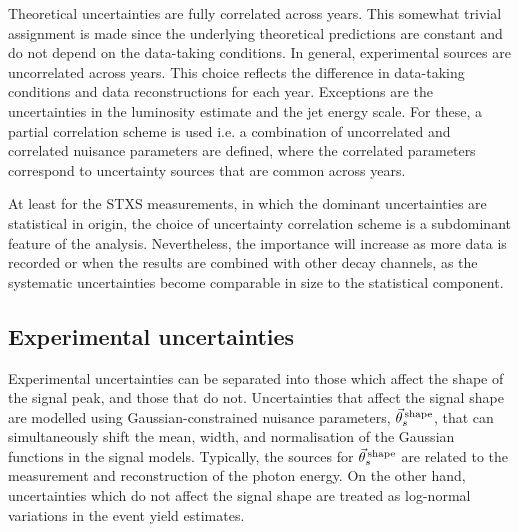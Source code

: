 Theoretical uncertainties are fully correlated across years. This somewhat trivial assignment is made since the underlying theoretical predictions are constant and do not depend on the data-taking conditions. In general, experimental sources are uncorrelated across years. This choice reflects the difference in data-taking conditions and data reconstructions for each year. Exceptions are the uncertainties in the luminosity estimate and the jet energy scale. For these, a partial correlation scheme is used i.e. a combination of uncorrelated and correlated nuisance parameters are defined, where the correlated parameters correspond to uncertainty sources that are common across years.

At least for the STXS measurements, in which the dominant uncertainties are statistical in origin, the choice of uncertainty correlation scheme is a subdominant feature of the analysis. Nevertheless, the importance will increase as more data is recorded or when the results are combined with other decay channels, as the systematic uncertainties become comparable in size to the statistical component.

\subsection{Experimental uncertainties}\label{sec:systematics_experimental}
Experimental uncertainties can be separated into those which affect the shape of the signal \mgg peak, and those that do not. Uncertainties that affect the signal shape are modelled using Gaussian-constrained nuisance parameters, $\vec{\theta}^{\,\rm{shape}}_{s}$, that can simultaneously shift the mean, width, and normalisation of the Gaussian functions in the signal models. Typically, the sources for $\vec{\theta}^{\,\rm{shape}}_{s}$ are related to the measurement and reconstruction of the photon energy. On the other hand, uncertainties which do not affect the signal shape are treated as log-normal variations in the event yield estimates. 

